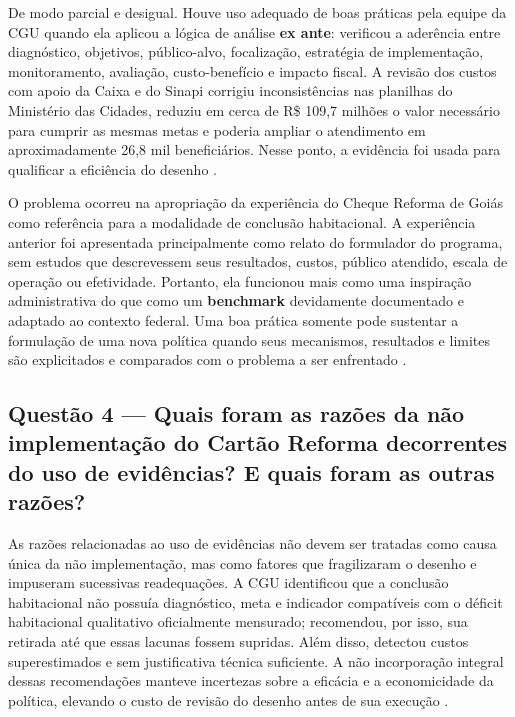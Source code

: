 \documentclass[12pt,a4paper]{article}
\begin{document}
De modo parcial e desigual. Houve uso adequado de boas práticas pela equipe da CGU quando ela aplicou a lógica de análise \textbf{ex ante}: verificou a aderência entre diagnóstico, objetivos, público-alvo, focalização, estratégia de implementação, monitoramento, avaliação, custo-benefício e impacto fiscal. A revisão dos custos com apoio da Caixa e do Sinapi corrigiu inconsistências nas planilhas do Ministério das Cidades, reduziu em cerca de R\$ 109,7 milhões o valor necessário para cumprir as mesmas metas e poderia ampliar o atendimento em aproximadamente 26,8 mil beneficiários. Nesse ponto, a evidência foi usada para qualificar a eficiência do desenho \parencite[p. 97]{santos2020cartao}.

O problema ocorreu na apropriação da experiência do Cheque Reforma de Goiás como referência para a modalidade de conclusão habitacional. A experiência anterior foi apresentada principalmente como relato do formulador do programa, sem estudos que descrevessem seus resultados, custos, público atendido, escala de operação ou efetividade. Portanto, ela funcionou mais como uma inspiração administrativa do que como um \textbf{benchmark} devidamente documentado e adaptado ao contexto federal. Uma boa prática somente pode sustentar a formulação de uma nova política quando seus mecanismos, resultados e limites são explicitados e comparados com o problema a ser enfrentado \parencite[pp. 95--96]{santos2020cartao}.

\subsection*{Questão 4 — Quais foram as razões da não implementação do Cartão Reforma decorrentes do uso de evidências? E quais foram as outras razões?}
\label{sec:orgbcd8f3d}

As razões relacionadas ao uso de evidências não devem ser tratadas como causa única da não implementação, mas como fatores que fragilizaram o desenho e impuseram sucessivas readequações. A CGU identificou que a conclusão habitacional não possuía diagnóstico, meta e indicador compatíveis com o déficit habitacional qualitativo oficialmente mensurado; recomendou, por isso, sua retirada até que essas lacunas fossem supridas. Além disso, detectou custos superestimados e sem justificativa técnica suficiente. A não incorporação integral dessas recomendações manteve incertezas sobre a eficácia e a economicidade da política, elevando o custo de revisão do desenho antes de sua execução \parencite[pp. 96--97]{santos2020cartao}.
\end{document}

